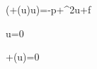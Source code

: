 \rho\left(+(\mathbf u\cdot\nabla)\mathbf u\right)=-\nabla p+\mu\nabla^2\mathbf u+\mathbf f

\nabla\cdot\mathbf u=0

+\nabla\cdot(\rho\mathbf u)=0
